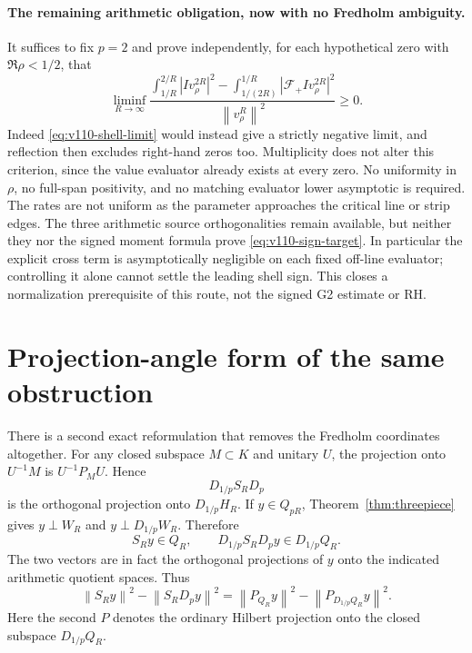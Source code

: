 \documentclass[11pt]{article}
\theoremstyle{remark}
\newcommand{\norm}[1]{\left\lVert #1\right\rVert}
\begin{document}
\paragraph{The remaining arithmetic obligation, now with no Fredholm ambiguity.}
It suffices to fix $p=2$ and prove independently, for each hypothetical
zero with $\Re\rho<1/2$, that
\begin{equation}\label{eq:v110-sign-target}
 \liminf_{R\to\infty}
 \frac{\displaystyle\int_{1/R}^{2/R}|Iv_\rho^{2R}|^2
       -\displaystyle\int_{1/(2R)}^{1/R}|\mathcal F_+Iv_\rho^{2R}|^2}
      {\norm{v_\rho^R}^2}\ge0.
\end{equation}
Indeed \eqref{eq:v110-shell-limit} would instead give a strictly negative
limit, and reflection then excludes right-hand zeros too. Multiplicity
does not alter this criterion, since the value evaluator already exists
at every zero. No uniformity in $\rho$, no full-span positivity, and no
matching evaluator lower asymptotic is required. The rates are not
uniform as the parameter approaches the critical line or strip edges.
The three arithmetic source orthogonalities remain available, but neither
they nor the signed moment formula prove \eqref{eq:v110-sign-target}.
In particular the explicit cross term is asymptotically negligible on
each fixed off-line evaluator; controlling it alone cannot settle the
leading shell sign. This closes a normalization prerequisite of this
route, not the signed G2 estimate or RH.

\section{Projection-angle form of the same obstruction}
There is a second exact reformulation that removes the Fredholm coordinates altogether. For any closed subspace $M\subset K$ and unitary $U$, the projection onto $U^{-1}M$ is $U^{-1}P_MU$. Hence
\[
 D_{1/p}S_RD_p
\]
is the orthogonal projection onto $D_{1/p}H_R$. If $y\in Q_{pR}$, Theorem~\ref{thm:threepiece} gives $y\perp W_R$ and $y\perp D_{1/p}W_R$. Therefore
\[
 S_Ry\in Q_R,
 \qquad
 D_{1/p}S_RD_py\in D_{1/p}Q_R.
\]
The two vectors are in fact the orthogonal projections of $y$ onto the indicated arithmetic quotient spaces. Thus
\begin{equation}\label{eq:angleform}
 \boxed{
 \norm{S_Ry}^2-\norm{S_RD_py}^2
 =\norm{P_{Q_R}y}^2-\norm{P_{D_{1/p}Q_R}y}^2.}
\end{equation}
Here the second $P$ denotes the ordinary Hilbert projection onto the closed subspace $D_{1/p}Q_R$.
\end{document}
